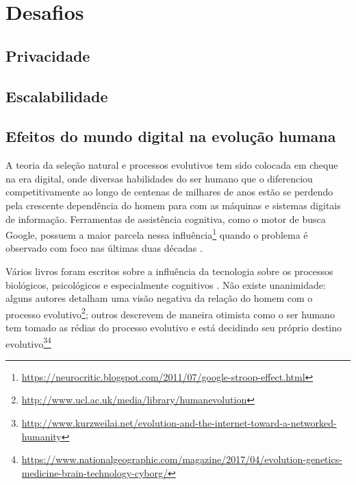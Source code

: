 \chapter{Desafios}



\section{Privacidade}



\section{Escalabilidade}



\section{Efeitos do mundo digital na evolução humana}

A teoria da seleção natural e processos evolutivos tem sido colocada em cheque na era digital, onde diversas habilidades do ser humano que o diferenciou competitivamente ao longo de centenas de milhares de anos estão se perdendo pela crescente dependência do homem para com as máquinas e sistemas digitais de informação. Ferramentas de assistência cognitiva, como o motor de busca Google, possuem a maior parcela nessa influência\footnote{\url{https://neurocritic.blogspot.com/2011/07/google-stroop-effect.html}} quando o problema é observado com foco nas últimas duas décadas \cite{Sparrow2011GoogleEO}. 

Vários livros foram escritos sobre a influência da tecnologia sobre os processos biológicos, psicológicos e especialmente cognitivos \cite{theshallows, theglasscage}. Não existe unanimidade: alguns autores detalham uma visão negativa da relação do homem com o processo evolutivo\footnote{\url{http://www.ucl.ac.uk/media/library/humanevolution}}; outros descrevem de maneira otimista como o ser humano tem tomado as rédias do processo evolutivo e está decidindo seu próprio destino evolutivo\footnote{\url{http://www.kurzweilai.net/evolution-and-the-internet-toward-a-networked-humanity}}\footnote{\url{https://www.nationalgeographic.com/magazine/2017/04/evolution-genetics-medicine-brain-technology-cyborg/}}